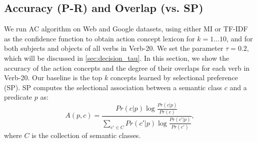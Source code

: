 \subsection{Accuracy (P-R) and Overlap (vs. SP)}
\label{sec:accuracy}
We run AC algorithm on Web and Google datasets,
using either MI or TF-IDF as the confidence function to obtain
action concept lexicon for $k=1 \dots 10$, 
and for both subjects and objects of all verbs in
Verb-20. We set the parameter $\tau=0.2$, which will be discussed
in \ref{sec:decision_tau}.
In this section, we show the accuracy of the action concepts
and the degree of their overlaps for each verb in Verb-20.
Our baseline is the top $k$ concepts learned by
selectional preference (SP)\cite{resnik1996selectional}.
SP computes the selectional association between a semantic class $c$
and a predicate $p$ as:
\begin{equation}
A(p,c)=\frac{Pr(c|p)\log\frac{Pr(c|p)}{Pr(c)}}
{\sum_{c'\in C}{Pr(c'|p)\log\frac{Pr(c'|p)}{Pr(c')}}},
\end{equation}
where $C$ is the collection of semantic classes.

